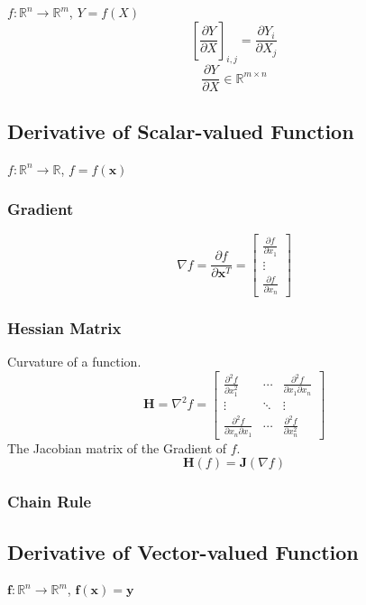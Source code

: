 \documentclass{article}
\begin{document}
$f: \mathbb{R}^n \to \mathbb{R}^m$, $Y = f(X)$
\[
    \left[\frac{\partial Y}{\partial X}\right]_{i,j} = \frac{\partial Y_{i}}{\partial X_{j}}
\]
\[
    \frac{\partial Y}{\partial X} \in \mathbb{R}^{m\times n}
\]


\subsection{Derivative of Scalar-valued Function}

$f: \mathbb{R}^n \to \mathbb{R}$, $f = f(\mathbf{x})$

\subsubsection{Gradient}

\[
    \nabla f = \frac{\partial f}{\partial \mathbf{x}^T} =
    \begin{bmatrix}
        \frac{\partial f}{\partial x_1} \\
        \vdots \\
        \frac{\partial f}{\partial x_n}
    \end{bmatrix}
\]

\subsubsection{Hessian Matrix}
Curvature of a function.
\[
    \mathbf{H} = \nabla^2 f =
    \begin{bmatrix}
        \frac{\partial^2 f}{\partial x_1^2} & \cdots & \frac{\partial^2 f}{\partial x_1 \partial x_n} \\
        \vdots & \ddots & \vdots \\
        \frac{\partial^2 f}{\partial x_n \partial x_1} & \cdots & \frac{\partial^2 f}{\partial x_n^2}
    \end{bmatrix}
\]
The Jacobian matrix of the Gradient of $f$.
\[
    \mathbf{H}(f) = \mathbf{J}(\nabla f)
\]

\subsubsection{Chain Rule}

\subsection{Derivative of Vector-valued Function}

$\mathbf{f}: \mathbb{R}^n \to \mathbb{R}^m$, $\mathbf{f}(\mathbf{x}) = \mathbf{y}$
\end{document}
